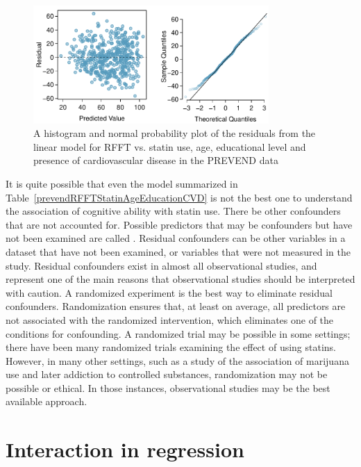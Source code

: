 \begin{figure}[h!]
	\centering
	\includegraphics[width=0.8\textwidth]
	{ch_multiple_linear_regression_oi_biostat/figures/prevendRFFTStatinAgeEducCVDResidNormPlot/prevendRFFTStatinAgeEducCVDResidNormPlot.pdf}
	\caption{A histogram and normal probability plot of the residuals from the linear model for RFFT vs. statin use, age, educational level and presence of cardiovascular disease in the PREVEND data}
	\label{prevendRFFTStatinAgeEducCVDResidNormPlot}
\end{figure}

It is quite possible that even the model summarized in Table~\ref{prevendRFFTStatinAgeEducationCVD} is not the best one to understand the association of cognitive ability with statin use. There be other confounders that are not accounted for.  Possible predictors that may be confounders but have not been examined are called .  Residual confounders can be other variables in a dataset that have not been examined, or variables that were not measured in the study.  Residual confounders exist in almost all observational studies, and represent one of the main reasons that observational studies should be interpreted with caution.  A randomized experiment is the best way to eliminate residual confounders. Randomization ensures that, at least on average, all predictors are not associated with the randomized intervention, which eliminates one of the conditions for confounding.  A randomized trial may be possible in some settings; there have been many randomized trials examining the effect of using statins. However, in many other settings, such as a study of the association of marijuana use and later addiction to controlled substances, randomization may not be possible or ethical.  In those instances, observational studies may be the best available approach.

\section{Interaction in regression}
\label{interactionRegression}

